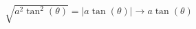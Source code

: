 \documentclass[preview]{standalone}
\begin{document}
\begin{align*}
\sqrt{a^2\tan^2(\theta)} = |a\tan(\theta)| \longrightarrow a\tan(\theta)
\end{align*}
\end{document}
